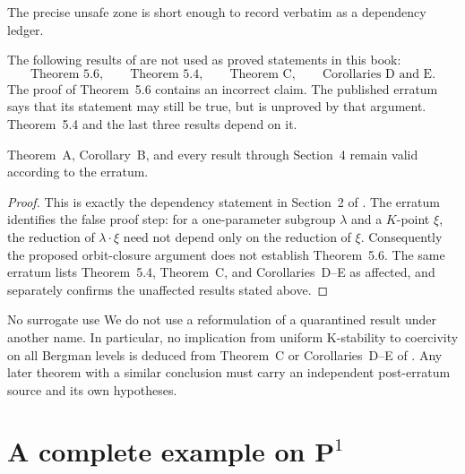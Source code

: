 The precise unsafe zone is short enough to record verbatim as a dependency
ledger.

\noindent\begin{minipage}{\linewidth}
\begin{theorem}\label{thm:rf-erratum-audit}
The following results of \cite{BHJ19} are not used as proved statements in
this book:
\[
 \text{Theorem~5.6},\qquad
 \text{Theorem~5.4},\qquad
 \text{Theorem~C},\qquad
 \text{Corollaries~D and~E}.
\tag{65.42}\label{eq:rf-quarantined-results}
\]
The proof of Theorem~5.6 contains an incorrect claim.
The published erratum says that its statement may still be true, but is
unproved by that argument.
Theorem~5.4 and the last three results depend on it.

Theorem~A, Corollary~B, and every result through Section~4 remain valid
according to the erratum.
\end{theorem}
\end{minipage}\par

\begin{proof}
This is exactly the dependency statement in Section~2 of
\cite{BHJ19err}.
The erratum identifies the false proof step: for a one-parameter subgroup
$\lambda$ and a $K$-point $\xi$, the reduction of
$\lambda\cdot\xi$ need not depend only on the reduction of $\xi$.
Consequently the proposed orbit-closure argument does not establish
Theorem~5.6.
The same erratum lists Theorem~5.4, Theorem~C, and Corollaries~D--E as
affected, and separately confirms the unaffected results stated above.
\end{proof}

\begin{warning}{No surrogate use}
\label{warn:rf-no-surrogate}
We do not use a reformulation of a quarantined result under another name.
In particular, no implication from uniform K-stability to coercivity on all
Bergman levels is deduced from Theorem~C or Corollaries~D--E of
\cite{BHJ19}.
Any later theorem with a similar conclusion must carry an independent
post-erratum source and its own hypotheses.
\end{warning}

\section{A complete example on \texorpdfstring{$\mathbf P^1$}{P1}}
\label{sec:rf-complete-p1}

